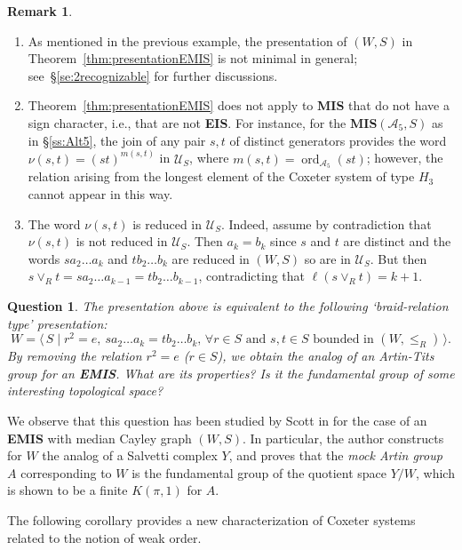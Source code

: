 \documentclass[A4paper, oneside]{amsart}
\newcommand{\mpair}[1]{\langle\, #1\,\rangle}  %
\newcommand{\ord}{\operatorname{ord}}
\newcommand{\A}{\mathcal{A}}
\newcommand{\U}{\mathcal{U}}
\newcommand{\EIS}{\textnormal{\bf EIS}\xspace}
\newcommand{\EMIS}{\textnormal{\bf EMIS}\xspace}
\newcommand{\MIS}{\textnormal{\bf MIS}\xspace}
\newtheorem{question}{Question}
\theoremstyle{definition}
\newtheorem{rem}[thm]{Remark}
\begin{document}
\begin{rem} 
\label{rem:presentation}
\begin{enumerate}
\item As mentioned in the previous example, the presentation of $(W,S)$ in Theorem~\ref{thm:presentationEMIS} is not minimal in general; see~\S\ref{se:2recognizable} for further discussions.
\item Theorem~\ref{thm:presentationEMIS} does not apply to \MIS that do not have a sign character, i.e., that are not \EIS. For instance, for the \MIS $(\A_5,S)$ as in \S\ref{ss:Alt5}, the join of any pair $s,t$ of distinct generators provides the word $\nu(s,t)=(st)^{m(s,t)}$ in $\U_S$, where $m(s,t)=\ord_{\A_5}(st)$; however, the relation arising from the longest element of  the Coxeter system of type $H_3$ cannot appear in this way.
\item  The word $\nu(s,t)$ is reduced in $\U_S$. Indeed, assume by contradiction that  $\nu(s,t)$ is not reduced in $\U_S$. Then $a_k=b_k$ since $s$ and $t$ are distinct and the words $sa_2\dots a_k$ and $tb_2\dots b_k$ are reduced in $(W,S)$ so are in $\U_S$. But then  $s\vee_R t =sa_2\dots a_{k-1}=tb_2\dots b_{k-1}$, 
contradicting that $\ell(s\vee_R t)=k+1$.  
\end{enumerate}
\end{rem}

\begin{question} The presentation above is equivalent to the following {\em `braid-relation type'} presentation:
$$
W=\mpair{S\mid r^2=e, \ sa_2\dots a_k=tb_2\dots b_k ,\, \forall r \in S \text{ and }  s, t \in S \textrm{ bounded in }(W,\leq_R)}.
$$
By removing the relation $r^2=e$ ($r\in S$), we obtain the analog of an Artin-Tits group for an \EMIS. What are its properties? Is it the fundamental group of some interesting topological space?
\end{question}

We observe that this question has been studied by Scott in \cite{RAMRG} for the case of an \EMIS with median Cayley graph $(W,S)$. In particular, the author constructs for $W$ the analog of a Salvetti complex $Y$, and proves that the \emph{mock Artin group} $A$ corresponding to $W$ is the fundamental group of the quotient space $Y/W$, which is shown to be a finite $K(\pi,1)$ for $A$.

\smallskip
The following corollary provides a new characterization of Coxeter systems related to the notion of weak order.
\end{document}
